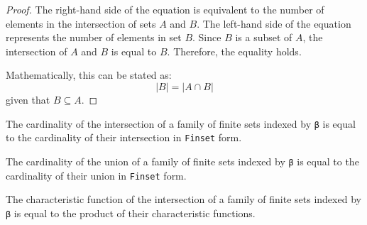 \begin{proof}
  \leanok
  The right-hand side of the equation is equivalent to the number of elements in the intersection of sets $A$ and $B$. The left-hand side of the equation represents the number of elements in set $B$. Since $B$ is a subset of $A$, the intersection of $A$ and $B$ is equal to $B$. Therefore, the equality holds.

  Mathematically, this can be stated as:
  \begin{equation*}
  |B| = |A \cap B|
  \end{equation*}
  given that $B \subseteq A$.
\end{proof}

\begin{lemma}\label{card_eq_FinInter}
  The cardinality of the intersection of a family of finite sets indexed by \verb|β| is equal to the cardinality of their intersection in \verb|Finset| form.
\end{lemma}

\begin{lemma}\label{card_eq_FinUnion}
  The cardinality of the union of a family of finite sets indexed by \verb|β| is equal to the cardinality of their union in \verb|Finset| form.
\end{lemma}

\begin{lemma}\label{char_fun_FinInter}
  \leanok
  The characteristic function of the intersection of a family of finite sets indexed by \verb|β| is equal to the product of their characteristic functions.
\end{lemma}

